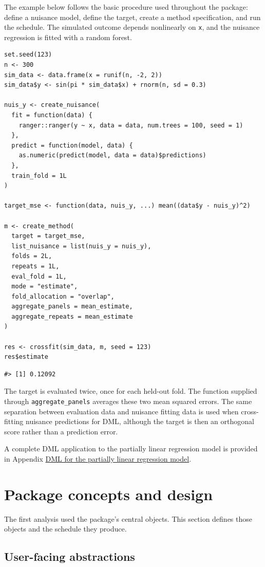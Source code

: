 The example below follows the basic procedure used throughout the package: define a nuisance model, define the target, create a method specification, and run the schedule. The simulated outcome depends nonlinearly on \texttt{x}, and the nuisance regression is fitted with a random forest.

\begin{verbatim}
set.seed(123)
n <- 300
sim_data <- data.frame(x = runif(n, -2, 2))
sim_data$y <- sin(pi * sim_data$x) + rnorm(n, sd = 0.3)

nuis_y <- create_nuisance(
  fit = function(data) {
    ranger::ranger(y ~ x, data = data, num.trees = 100, seed = 1)
  },
  predict = function(model, data) {
    as.numeric(predict(model, data = data)$predictions)
  },
  train_fold = 1L
)

target_mse <- function(data, nuis_y, ...) mean((data$y - nuis_y)^2)

m <- create_method(
  target = target_mse,
  list_nuisance = list(nuis_y = nuis_y),
  folds = 2L,
  repeats = 1L,
  eval_fold = 1L,
  mode = "estimate",
  fold_allocation = "overlap",
  aggregate_panels = mean_estimate,
  aggregate_repeats = mean_estimate
)

res <- crossfit(sim_data, m, seed = 123)
res$estimate
\end{verbatim}

\begin{verbatim}
#> [1] 0.12092
\end{verbatim}

The target is evaluated twice, once for each held-out fold. The function supplied through \texttt{aggregate\_panels} averages these two mean squared errors. The same separation between evaluation data and nuisance fitting data is used when cross-fitting nuisance predictions for DML, although the target is then an orthogonal score rather than a prediction error.

A complete DML application to the partially linear regression model is provided in Appendix \hyperref[app:plr-pension]{DML for the partially linear regression model}.

\section{Package concepts and design}\label{sec:design}

The first analysis used the package's central objects. This section defines those objects and the schedule they produce.

\subsection{User-facing abstractions}\label{subsec:user-facing}

